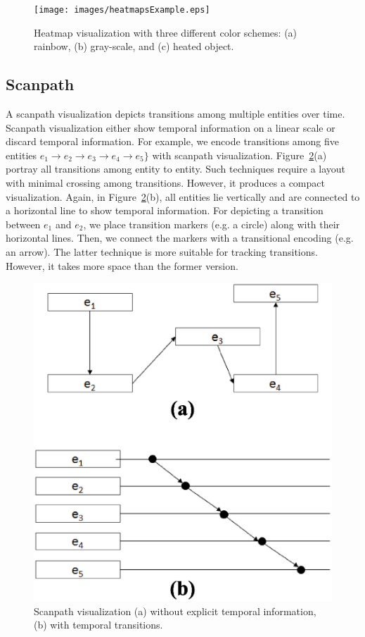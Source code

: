 \begin{figure}[htbp]
  \centering
  \texttt{[image: images/heatmapsExample.eps]}
  \caption{Heatmap visualization with three different color schemes: (a) rainbow, (b) gray-scale, and (c) heated object.}
	\label{fig:heatmapsExample}
\end{figure}



\subsection{Scanpath}
A scanpath visualization depicts transitions among multiple entities over time. Scanpath visualization either show temporal information on a linear scale or discard temporal information. For example, we encode transitions among five entities $e_1 \rightarrow e_2\rightarrow e_3\rightarrow e_4\rightarrow e_5\}$ with scanpath visualization. Figure~\ref{fig:scanpathExample}(a) portray all transitions among entity to entity. Such techniques require a layout with minimal crossing among transitions. However, it produces a compact visualization. Again, in Figure~\ref{fig:scanpathExample}(b), all entities lie vertically and are connected to a horizontal line to show temporal information. For depicting a transition between $e_1$ and $e_2$, we place transition markers (e.g. a circle) along with their horizontal lines. Then, we connect the markers with a transitional encoding (e.g. an arrow). The latter technique is more suitable for tracking transitions. However, it takes more space than the former version. 

\begin{figure}[htbp]
  \centering
  \includegraphics[width=\linewidth]{images/scanpathExample.eps}
  \caption{Scanpath visualization (a) without explicit temporal information, (b) with temporal transitions.}
	\label{fig:scanpathExample}
\end{figure}

